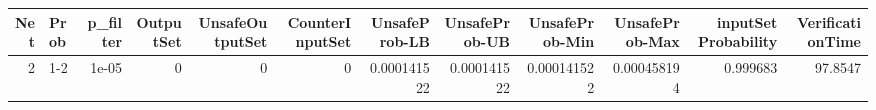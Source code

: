 \begin{tabular}{rlrrrrrrrrrr}
\hline
   Net & Prob   &   p\_filter &   OutputSet &   UnsafeOutputSet &   CounterInputSet &   UnsafeProb-LB &   UnsafeProb-UB &   UnsafeProb-Min &   UnsafeProb-Max &   inputSet Probability &   VerificationTime \\
\hline
     2 & 1-2    &      1e-05 &           0 &                 0 &                 0 &     0.000141522 &     0.000141522 &      0.000141522 &      0.000458194 &               0.999683 &            97.8547 \\
\hline
\end{tabular}
